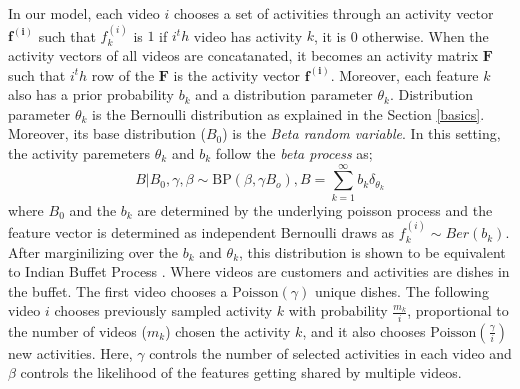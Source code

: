 In our model, each video $i$ chooses a set of activities through an activity vector $\mathbf{f^{(i)}}$ such that $f^{(i)}_k$ is $1$ if $i^th$ video has activity $k$, it is 0 otherwise. When the activity vectors of all videos are concatanated, it becomes an activity matrix $\mathbf{F}$ such that $i^th$ row of the $\mathbf{F}$ is the activity vector $\mathbf{f^{(i)}}$. Moreover, each feature $k$ also has a prior probability $b_k$  and a distribution parameter $\theta_k$. Distribution parameter $\theta_k$ is the Bernoulli distribution as explained in the Section \ref{basics}. Moreover, its base distribution ($B_0$) is the \emph{Beta random variable}. In this setting, the activity paremeters $\theta_k$ and $b_k$ follow the \emph{beta process} as;
\begin{equation}
  B|B_0,\gamma,\beta \sim \text{BP}(\beta,\gamma B_o), B=\sum_{k=1}^\infty b_k \delta_{\theta_k}
\end{equation}
where $B_0$ and the $b_k$ are determined by the underlying poisson process \cite{ibp} and the feature vector is determined as independent Bernoulli draws as $f_{k}^{(i)} \sim Ber(b_k)$. After marginilizing over the $b_k$ and $\theta_k$, this distribution is shown to be equivalent to Indian Buffet Process \cite{ibp}. Where videos are customers and activities are dishes in the buffet. The first video chooses a $\text{Poisson}(\gamma)$ unique dishes. The following video $i$ chooses previously sampled activity $k$ with probability $\frac{m_k}{i}$,  proportional to the number of videos ($m_k$) chosen the activity $k$, and it also chooses $\text{Poisson}(\frac{\gamma}{i})$ new activities. Here, $\gamma$ controls the number of selected activities in each video and $\beta$ controls the likelihood of the features getting shared by multiple videos.

